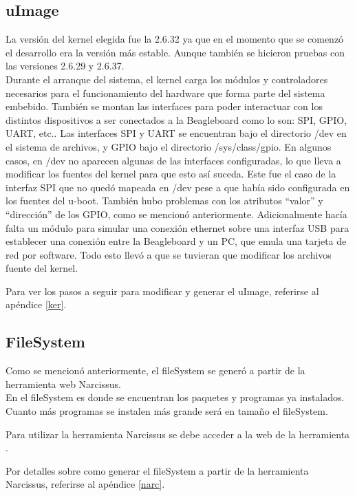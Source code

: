 \subsection{uImage}
La versión del kernel elegida fue la 2.6.32 ya que en el momento que se comenzó el desarrollo era la versión más estable. Aunque también se hicieron pruebas con las versiones 2.6.29 y 2.6.37.\\
Durante el arranque del sistema, el kernel carga los módulos y controladores necesarios para el funcionamiento del 
hardware que forma parte del sistema embebido. También se montan las interfaces para poder interactuar con los distintos dispositivos a ser conectados a la Beagleboard como lo son: SPI, GPIO, UART, etc.. Las interfaces SPI y UART se encuentran bajo el directorio /dev en el sistema de archivos, y GPIO bajo el directorio /sys/class/gpio. En algunos casos, en /dev no aparecen algunas de las interfaces configuradas, lo que lleva a modificar los fuentes del kernel para que esto así suceda. Este fue el caso de la interfaz SPI que no quedó mapeada en /dev pese a que había sido configurada en los fuentes del u-boot. También hubo problemas con los atributos “valor” y “dirección” de los GPIO, como se mencionó anteriormente. Adicionalmente hacía falta un módulo para simular una conexión ethernet sobre una interfaz USB para establecer una conexión entre la Beagleboard y un PC, que emula una tarjeta de red por software.
Todo esto llevó a que se tuvieran que modificar los archivos fuente del kernel.

Para ver los pasos a seguir para modificar y generar el uImage, referirse al apéndice \ref{ker}.

\subsection{FileSystem}

Como se mencionó anteriormente, el fileSystem se generó a partir de la herramienta web Narcissus.\\
En el fileSystem es donde se encuentran los paquetes y programas ya instalados. Cuanto más programas se instalen más grande será en tamaño el fileSystem.

\bigskip
Para utilizar la herramienta Narcissus se debe acceder a la web de la herramienta \cite{Narc}.


\bigskip
Por detalles sobre como generar el fileSystem a partir de la herramienta Narcissus, referirse al apéndice \ref{narc}.


